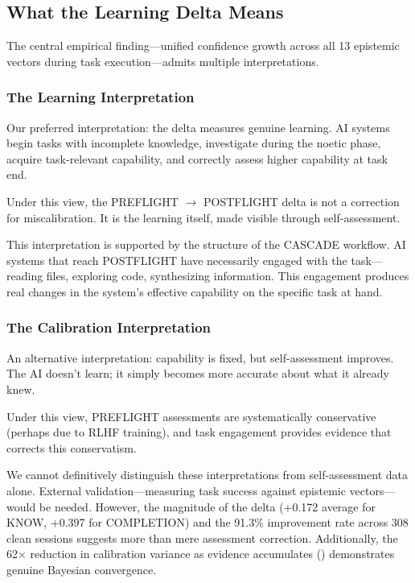 
\subsection{What the Learning Delta Means}

The central empirical finding---unified confidence growth across all 13 epistemic vectors during task execution---admits multiple interpretations.

\subsubsection{The Learning Interpretation}

Our preferred interpretation: the delta measures genuine learning. AI systems begin tasks with incomplete knowledge, investigate during the noetic phase, acquire task-relevant capability, and correctly assess higher capability at task end.

Under this view, the PREFLIGHT $\rightarrow$ POSTFLIGHT delta is not a correction for miscalibration. It is the learning itself, made visible through self-assessment.

This interpretation is supported by the structure of the CASCADE workflow. AI systems that reach POSTFLIGHT have necessarily engaged with the task---reading files, exploring code, synthesizing information. This engagement produces real changes in the system's effective capability on the specific task at hand.

\subsubsection{The Calibration Interpretation}

An alternative interpretation: capability is fixed, but self-assessment improves. The AI doesn't learn; it simply becomes more accurate about what it already knew.

Under this view, PREFLIGHT assessments are systematically conservative (perhaps due to RLHF training), and task engagement provides evidence that corrects this conservatism.

We cannot definitively distinguish these interpretations from self-assessment data alone. External validation---measuring task success against epistemic vectors---would be needed. However, the magnitude of the delta (+0.172 average for KNOW, +0.397 for COMPLETION) and the 91.3\% improvement rate across 308 clean sessions suggests more than mere assessment correction. Additionally, the 62$\times$ reduction in calibration variance as evidence accumulates () demonstrates genuine Bayesian convergence.

